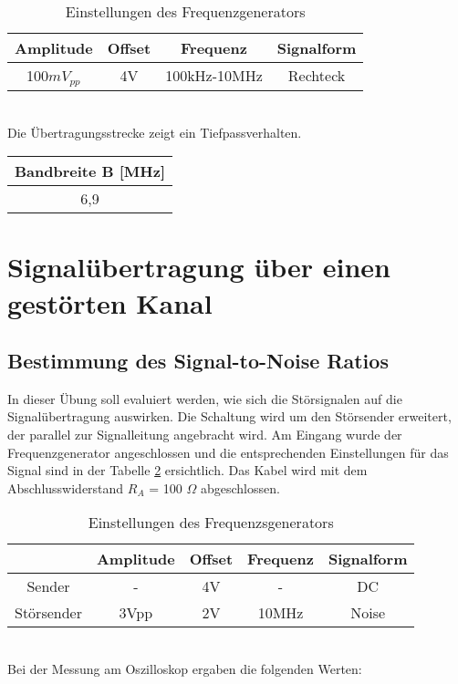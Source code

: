 \begin{table}[!h]
	\centering
	\begin{tabular}{|c|c|c|c|}
		\hline 
		Amplitude		& Offset	& Frequenz		& Signalform		\\ 
		\hline 
		100$mV_{pp}$	& 4V		& 100kHz-10MHz	& Rechteck		\\ 
		\hline 
	\end{tabular}
	\caption{Einstellungen des Frequenzgenerators}
	\label{tb:einst_bandl}
\end{table}
~\\
Die Übertragungsstrecke zeigt ein Tiefpassverhalten.

\begin{table}[!h]
	\centering
	\begin{tabular}{|c|}
		\hline 
		Bandbreite B [MHz]		\\ 
		\hline 
		6,9				\\ 
		\hline 
	\end{tabular}
\end{table}



\section{Signalübertragung über einen gestörten Kanal}

\subsection{Bestimmung des Signal-to-Noise Ratios}

In dieser Übung soll evaluiert werden, wie sich die Störsignalen auf die Signalübertragung auswirken. Die Schaltung wird um den Störsender erweitert, der parallel zur Signalleitung angebracht wird. Am Eingang wurde der Frequenzgenerator angeschlossen und die entsprechenden Einstellungen für das Signal sind in der Tabelle \ref{tb:einst_stor} ersichtlich. Das Kabel wird mit dem Abschlusswiderstand $R_A$ = 100 $\Omega$ abgeschlossen.

\begin{table}[!h]
	\centering
	\begin{tabular}{|c|c|c|c|c|}
	\hline 
			& Amplitude		& Offset 	& Frequenz 		& Signalform		\\ 
	\hline 
	Sender	& -			& 4V		& -			& DC			\\ 
	\hline 
	Störsender	& 3Vpp		& 2V		& 10MHz		& Noise 		\\ 
	\hline 
	\end{tabular}
	\caption{Einstellungen des Frequenzsgenerators}
	\label{tb:einst_stor}
\end{table}
~\\
Bei der Messung am Oszilloskop ergaben die folgenden Werten:

